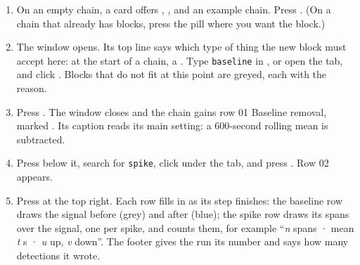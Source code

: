 \begin{enumerate}
  \item On an empty chain, a  card offers ,
    , and an example chain. Press . (On a
    chain that already has blocks, press the  pill where you want the block.)
  \item The  window opens. Its top line says which type of thing the new
    block must accept here: at the start of a chain, a . Type
    \texttt{baseline} in , or open the  tab, and click
    . Blocks that do not fit at this point are greyed, each with the
    reason.
  \item Press . The window closes and the chain gains row \textsf{01 Baseline
    removal}, marked . Its caption reads its main setting: a 600-second rolling mean
    is subtracted.
  \item Press  below it, search for \texttt{spike}, click
     under the  tab, and press . Row
    \textsf{02} appears.
  \item Press  at the top right. Each row fills in as its step finishes:
    the baseline row draws the signal before (grey) and after (blue); the spike row draws its
    spans over the signal, one per spike, and counts them, for example ``\textit{n} spans ·
    mean \textit{t} s · \textit{u} up, \textit{v} down''. The footer gives the run its number and says how many detections it wrote.
\end{enumerate}



